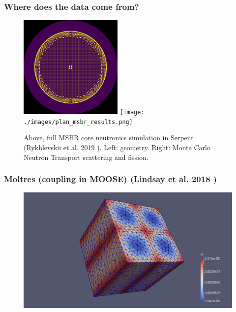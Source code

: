 \begin{frame}
        \frametitle{Where does the data come from?}
        \begin{center} 
                \begin{figure}
                        \includegraphics[width=0.45\textwidth]{./images/plan_msbr.png}
                        \texttt{[image: ./images/plan\_msbr\_results.png]}
                        \caption{Above, full \gls{MSBR} core neutronics simulation in 
                        Serpent (Rykhlevskii et al. 2019
                        \cite{rykhlevskii_modeling_2019}). Left: geometry. 
                        Right: Monte Carlo Neutron Transport scattering and 
                        fission.}
                \end{figure}
        \end{center}
\end{frame}


\begin{frame}
        \frametitle{Moltres (coupling in MOOSE) (Lindsay et al. 2018 \cite{lindsay_introduction_2018})}
  \begin{figure}
   \vspace{-0.05in}
   \includegraphics[height=0.75\textheight]{./images/lindsay_msre_moose.png}
    \end{figure}
\end{frame}



